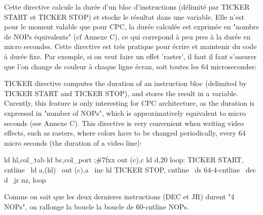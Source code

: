 \begin{xfr}
Cette directive calcule la durée d'un bloc d'instructions (délimité par TICKER START et TICKER STOP) et stocke le résultat dans une variable. Elle n'est pour le moment valable que pour CPC, la durée calculée est exprimée en "nombre de NOPs équivalents" (cf Annexe C), ce qui correpond à peu pres à la durée en micro secondes. Cette directive est très pratique pour écrire et maintenir du code à durée fixe. Par exemple, si on veut faire un effet 'raster', il faut il faut s'assurer que l'on change de couleur à chaque ligne écran, soit toutes les 64 microsecondes:
\end{xfr}
\begin{xen}
TICKER directive computes the duration of an instruction bloc (delimited by TICKER START and TICKER STOP), and stores the result in a variable. Curently, this feature is only interesting for CPC architecture, as the duration is expressed in "number of NOPs", which is approximatively equivalent to micro seconds (see Annexe C). This directive is very convenient when writing video effects, such as rasters, where colors have to be changed periodically, every 64 micro seconds (the duration of a video line):
\end{xen}

\begin{code}
ld hl,col\_tab
ld bc,col\_port  ;\#7fxx
out (c),c
ld d,20
loop:
TICKER START, cntline
\ ld a,(hl)
\ out (c),a
\ inc hl
TICKER STOP, cntline
\ ds 64-4-cntline
\ dec d
\	jr nz, loop
\end{code}

\begin{xfr}
Comme on sait que les deux dernieres instructions (DEC et JR) durent "4 NOPs",
on rallonge la boucle la boucle de 60-cntline NOPs.
\end{xfr}
